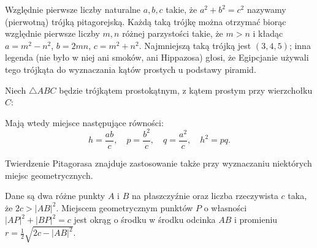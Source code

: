 Względnie pierwsze liczby naturalne $a, b, c$ takie, że $a^2 + b^2 = c^2$ nazywamy (pierwotną) trójką pitagorejską.
%
Każdą taką trójkę można otrzymać biorąc względnie pierwsze liczby $m, n$ różnej parzystości takie, że $m > n$ i kładąc $a = m^2 - n^2$, $b = 2 mn$, $c = m^2 + n^2$.
Najmniejszą taką trójką jest $(3, 4, 5)$; inna legenda (nie było w niej ani smoków, ani Hippazosa) głosi, że Egipcjanie używali tego trójkąta do wyznaczania kątów prostych u podstawy piramid.

\begin{proposition}
    Niech $\triangle ABC$ będzie trójkątem prostokątnym, z kątem prostym przy wierzchołku $C$:
        \begin{center}
\begin{comment}
    \begin{tikzpicture}[scale=.4]
        \tkzDefPoint(200:5){A}
        \tkzDefPoint(20:5){B}
        \tkzDefPoint(90:5){C}
        \tkzDefPointsBy[projection=onto A--B](C){D}
        \tkzLabelPoint[below left](200:5){A}
        \tkzLabelPoint[below right](22:5.3){B}
        \tkzLabelPoint[above](90:5.2){C}
        
        \tkzMarkRightAngle[size=0.8](A,C,B)
        \tkzDrawPolygons[line width=0.2mm](A,B,C)
        \tkzDrawSegment[dim={$\,\,p\,\,$,-8pt,transform shape,sloped}](A,D)
        \tkzDrawSegment[dim={$\,\,q\,\,$,-8pt,transform shape,sloped}](D,B)
        \tkzDrawSegment[dim={$\,\,b\,\,$,-8pt,transform shape,sloped}](C,A)
        \tkzDrawSegment[dim={$\,\,a\,\,$,-8pt,transform shape,sloped}](B,C)
        \tkzDrawPoints[size=3,color=black,fill=black!50](A,B,C)
        \tkzDrawSegment[dim={$\,\,h\,\,$,-0pt,transform shape,sloped}](C,D)
\end{tikzpicture}
\end{comment}
    \end{center}
    Mają wtedy miejsce następujące równości:
    \begin{equation}
        h = \frac{ab}{c}, \quad
        p = \frac{b^2}{c}, \quad
        q = \frac{a^2}{c}, \quad
        h^2 = pq.
    \end{equation}
\end{proposition}

Twierdzenie Pitagorasa znajduje zastosowanie także przy wyznaczaniu niektórych miejsc geometrycznych.

\begin{proposition}
    Dane są dwa różne punkty $A$ i $B$ na płaszczyźnie oraz liczba rzeczywista $c$ taka, że $2c > |AB|^2$.
    Miejscem geometrycznym punktów $P$ o własności $|AP|^2 + |BP|^2 = c$ jest okrąg o środku w środku odcinka $AB$ i promieniu $r = \frac 1 2 \sqrt{2c - |AB|^2}$.
\end{proposition}

